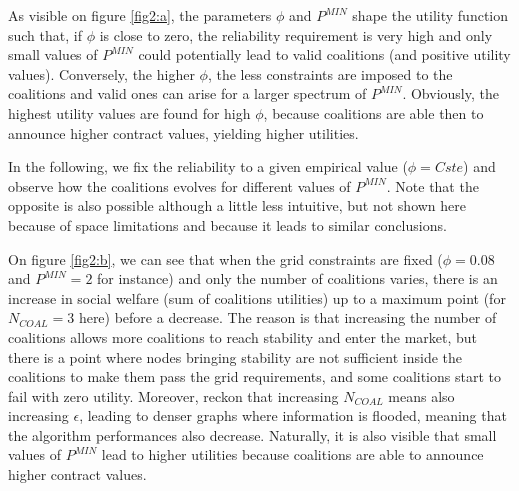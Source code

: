 \documentclass[conference]{IEEEtran}
\begin{document}
As visible on figure \ref{fig2:a}, the parameters $\phi$ and $P^{MIN}$ shape the utility function such that, if $ \phi $ is close to zero, the reliability requirement is very high and only small values of $ P^{MIN}$ could potentially lead to valid coalitions (and positive utility values). Conversely, the higher $\phi$, the less constraints are imposed to the coalitions and valid ones can arise for a larger spectrum of $ P^{MIN}$. Obviously, the highest utility values are found for high $ \phi $, because coalitions are able then to announce higher contract values, yielding higher utilities. 

In the following, we fix the reliability to a given empirical value ($\phi = Cste $) and observe how the coalitions evolves for different values of $P^{MIN}$. Note that the opposite is also possible although a little less intuitive, but not shown here because of space limitations and because it leads to similar conclusions. 

On figure \ref{fig2:b}, we can see that when the grid constraints are fixed ($ \phi = 0.08 $ and $ P^{MIN} = 2 $ for instance) and only the number of coalitions varies, there is an increase in social welfare (sum of coalitions utilities) up to a maximum point (for $ N_{COAL} = 3 $ here) before a decrease. The reason is that increasing the number of coalitions allows more coalitions to reach stability and enter the market, but there is a point where nodes bringing stability are not sufficient inside the coalitions to make them pass the grid requirements, and some coalitions start to fail with zero utility. Moreover, reckon that increasing $ N_{COAL} $ means also increasing $ \epsilon $, leading to denser graphs where information is flooded, meaning that the algorithm performances also decrease.
Naturally, it is also visible that small values of $P^{MIN}$ lead to higher utilities because coalitions are able to announce higher contract values.
\end{document}
